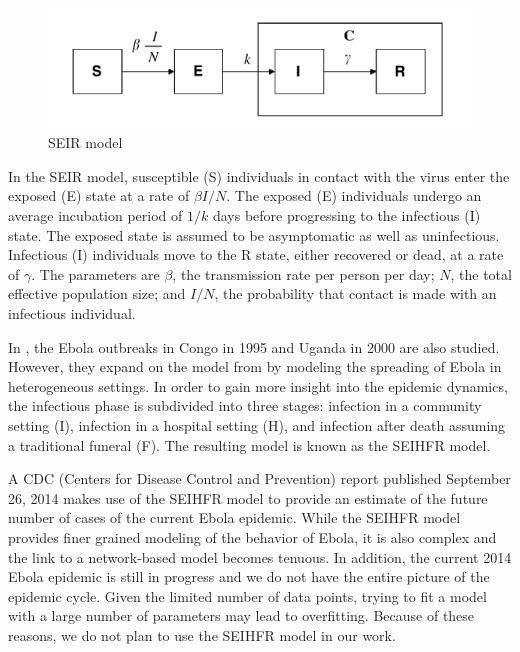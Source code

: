 \documentclass[10pt, journal,onecolumn]{IEEEtran}
\begin{document}
\begin{figure}[h!]
\captionsetup{justification=centering}
\includegraphics[scale=0.4]{seir_model_fig}
\centering\caption{SEIR model}
\label{fig:SEIR_model}
\end{figure}

In the SEIR model, susceptible (S) individuals in contact with the virus enter the exposed (E) state
at a rate of $\beta I / N$.
The exposed (E) individuals undergo an average incubation period of $1/k$ days before progressing to
the infectious (I) state. The exposed state is assumed to be asymptomatic as well as uninfectious.
Infectious (I) individuals move to the R state, either recovered or dead, at a rate of $\gamma$.
 The parameters are $\beta$, the transmission rate per person per day;
$N$, the total effective population size; and $I/N$, the probability that contact is made with
an infectious individual.

In \citep{legrand2007understanding}, the Ebola outbreaks in Congo in 1995 and Uganda in 2000 are
also studied. However, they expand on the model from \citep{chowell2004basic} by modeling the
spreading of Ebola in heterogeneous settings. In order to gain more insight into the epidemic
dynamics, the infectious phase is subdivided into three stages: infection in a community setting
(I), infection in a hospital setting (H), and infection after death assuming a traditional funeral
(F). The resulting model is known as the SEIHFR model.

A CDC (Centers for Disease Control and Prevention) report \citep{meltzer2014estimating} published
September 26, 2014 makes use of the SEIHFR model to provide an estimate of the future number of cases
of the current Ebola epidemic. While the SEIHFR model provides finer grained modeling of the behavior of
Ebola, it is also complex and the link to a network-based model becomes tenuous. In addition, the
current 2014 Ebola epidemic is still in progress and we do not have the entire picture of the
epidemic cycle. Given the limited number of data points, trying to fit a model with a large number of
parameters may lead to overfitting.  Because of these reasons, we do not plan to use the SEIHFR
model in our work.
\end{document}
